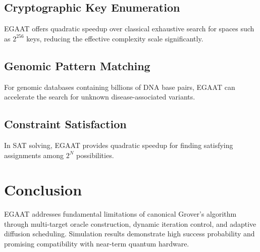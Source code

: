 \documentclass[journal]{IEEEtran}
\begin{document}
\subsection{Cryptographic Key Enumeration}
EGAAT offers quadratic speedup over classical exhaustive search for spaces such as $2^{256}$ keys, reducing the effective complexity scale significantly.
\subsection{Genomic Pattern Matching}
For genomic databases containing billions of DNA base pairs, EGAAT can accelerate the search for unknown disease-associated variants.
\subsection{Constraint Satisfaction}
In SAT solving, EGAAT provides quadratic speedup for finding satisfying assignments among $2^N$ possibilities.

\section{Conclusion}
EGAAT addresses fundamental limitations of canonical Grover’s algorithm through multi-target oracle construction, dynamic iteration control, and adaptive diffusion scheduling. Simulation results demonstrate high success probability and promising compatibility with near-term quantum hardware.



\end{document}
